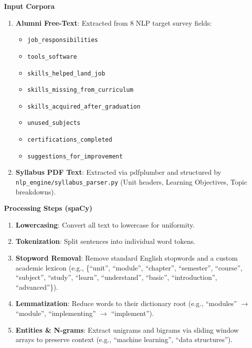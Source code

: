 \textbf{Input Corpora}
\begin{enumerate}
    \item \textbf{Alumni Free-Text}: Extracted from 8 NLP target survey fields:
    \begin{itemize}
        \item \texttt{job\_responsibilities}
        \item \texttt{tools\_software}
        \item \texttt{skills\_helped\_land\_job}
        \item \texttt{skills\_missing\_from\_curriculum}
        \item \texttt{skills\_acquired\_after\_graduation}
        \item \texttt{unused\_subjects}
        \item \texttt{certifications\_completed}
        \item \texttt{suggestions\_for\_improvement}
    \end{itemize}
    \item \textbf{Syllabus PDF Text}: Extracted via pdfplumber and structured by \texttt{nlp\_engine/\allowbreak syllabus\_parser.py} (Unit headers, Learning Objectives, Topic breakdowns).
\end{enumerate}

\textbf{Processing Steps (spaCy)}
\begin{enumerate}
    \item \textbf{Lowercasing}: Convert all text to lowercase for uniformity.
    \item \textbf{Tokenization}: Split sentences into individual word tokens.
    \item \textbf{Stopword Removal}: Remove standard English stopwords and a custom academic lexicon (e.g., \{``unit'', ``module'', ``chapter'', ``semester'', ``course'', ``subject'', ``study'', ``learn'', ``understand'', ``basic'', ``introduction'', ``advanced''\}).
    \item \textbf{Lemmatization}: Reduce words to their dictionary root (e.g., ``modules'' $\rightarrow$ ``module'', ``implementing'' $\rightarrow$ ``implement'').
    \item \textbf{Entities \& N-grams}: Extract unigrams and bigrams via sliding window arrays to preserve context (e.g., ``machine learning'', ``data structures'').
\end{enumerate}

